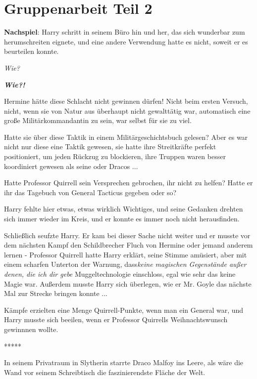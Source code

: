 \chapter{Gruppenarbeit Teil 2}

\textbf{Nachspiel}: Harry schritt in seinem Büro hin und her, das sich wunderbar
zum herumschreiten eignete, und eine andere Verwendung hatte es nicht, soweit er
es beurteilen konnte.

\emph{Wie?}

\textbf{\emph{Wie?!}}

Hermine hätte diese Schlacht nicht gewinnen dürfen! Nicht beim ersten Versuch,
nicht, wenn sie von Natur aus überhaupt nicht gewalttätig war, automatisch eine
große Militärkommandantin zu sein, war selbst für sie zu viel.

Hatte sie über diese Taktik in einem Militärgeschichtsbuch gelesen? Aber es war
nicht nur diese eine Taktik gewesen, sie hatte ihre Streitkräfte perfekt
positioniert, um jeden Rückzug zu blockieren, ihre Truppen waren besser
koordiniert gewesen als seine oder Dracos ...

Hatte Professor Quirrell sein Versprechen gebrochen, ihr nicht zu helfen? Hatte
er ihr das Tagebuch von General Tacticus gegeben oder so?

Harry fehlte hier etwas, etwas wirklich Wichtiges, und seine Gedanken drehten
sich immer wieder im Kreis, und er konnte es immer noch nicht herausfinden.

Schließlich seufzte Harry. Er kam bei dieser Sache nicht weiter und er musste
vor dem nächsten Kampf den Schildbrecher Fluch von Hermine oder jemand anderem
lernen - Professor Quirrell hatte Harry erklärt, seine Stimme amüsiert, aber mit
einem scharfen Unterton der Warnung, dass\emph{\glqq{}keine magischen
Gegenstände außer denen, die ich dir gebe\grqq{}} Muggeltechnologie einschloss,
egal wie sehr das keine Magie war. Außerdem musste Harry sich überlegen, wie er
Mr. Goyle das nächste Mal zur Strecke bringen konnte ...

Kämpfe erzielten eine Menge Quirrell-Punkte, wenn man ein General war, und Harry
musste sich beeilen, wenn er Professor Quirrells Weihnachtswunsch gewinnnen
wollte.

\begin{center}*****\end{center}

In seinem Privatraum in Slytherin starrte Draco Malfoy ins Leere, als wäre die
Wand vor seinem Schreibtisch die faszinierendste Fläche der Welt.

